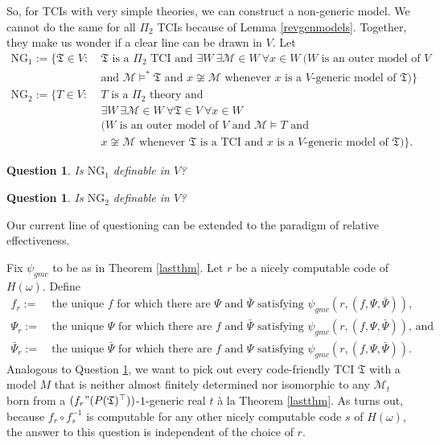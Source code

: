 \documentclass[12pt, twoside]{memoir}
\numberwithin{equation}{section}
\newtheorem{ques}[thm]{Question}
\theoremstyle{definition}
\theoremstyle{remark}
\theoremstyle{definition}
\theoremstyle{definition}
\theoremstyle{definition}
\theoremstyle{remark}
\begin{document}
So, for TCIs with very simple theories, we can construct a non-generic model. We cannot do the same for all $\Pi_2$ TCIs because of Lemma \ref{revgenmodels}. Together, they make us wonder if a clear line can be drawn in $V$. Let 
\begin{align*}
    \mathrm{NG}_1 := \{\mathfrak{T} \in V : \ & \mathfrak{T} \text{ is a } \Pi_2 \text{ TCI and } \exists W \ \exists \mathcal{M} \! \in \! W \ \forall x \! \in \! W \ (W \text{ is an outer model of } V \\
    & \text{and } \mathcal{M} \models^* \mathfrak{T} \text{ and } x \not\cong \mathcal{M} \text{ whenever } x \text{ is a } V \text{-generic model of } \mathfrak{T})\} \\
    \mathrm{NG}_2 := \{T \in V : \ & T \text{ is a } \Pi_2 \text{ theory and } \\
    & \exists W \ \exists \mathcal{M} \! \in \! W \ \forall \mathfrak{T} \! \in \! V \ \forall x \! \in \! W \\
    & (W \text{ is an outer model of } V \text{ and } \mathcal{M} \models T \text{ and } \\
    & x \not\cong \mathcal{M} \text{ whenever } \mathfrak{T} \text{ is a TCI and } x \text{ is a } V \text{-generic model of } \mathfrak{T})\} \text{.}
\end{align*}

\begin{ques}\label{q548}
Is $\mathrm{NG}_1$ definable in $V$?
\end{ques}

\begin{ques}\label{q552}
Is $\mathrm{NG}_2$ definable in $V$?
\end{ques}

Our current line of questioning can be extended to the paradigm of relative effectiveness.

Fix $\psi_{gmc}$ to be as in Theorem \ref{lastthm}. Let $r$ be a nicely computable code of $H(\omega)$. Define
\begin{align*}
    f_r := \ & \text{the unique } f \text{ for which there are } \Psi \text{ and } \bar{\Psi} \text{ satisfying } \psi_{gmc}(r, (f, \Psi, \bar{\Psi})) \text{,} \\
    \Psi_r := \ & \text{the unique } \Psi \text{ for which there are } f \text{ and } \bar{\Psi} \text{ satisfying } \psi_{gmc}(r, (f, \Psi, \bar{\Psi})) \text{, and} \\
    \bar{\Psi}_r := \ & \text{the unique } \bar{\Psi} \text{ for which there are } f \text{ and } \Psi \text{ satisfying } \psi_{gmc}(r, (f, \Psi, \bar{\Psi})) \text{.}
\end{align*}
Analogous to Question \ref{q548}, we want to pick out every code-friendly TCI $\mathfrak{T}$ with a model $M$ that is neither almost finitely determined nor isomorphic to any $\mathcal{M}_t$ born from a $(f_r" (P(\mathfrak{T})^{\top}))$-$1$-generic real $t$ \`{a} la Theorem \ref{lastthm}. As turns out, because $f_r \circ f_s^{-1}$ is computable for any other nicely computable code $s$ of $H(\omega)$, the answer to this question is independent of
the choice of $r$.
\end{document}
